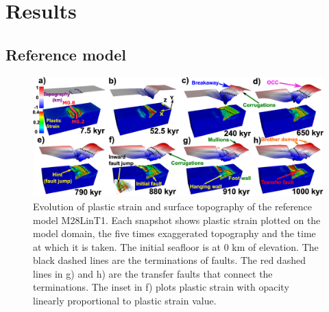 \pagebreak
\section{Results}

\subsection{Reference model}\label{sec_M28LinT1}

\begin{figure}[h]
  \centering
    \includegraphics[width=1.0\textwidth]{./Figures/fig_Results_1_reference_model.eps}
  \caption{Evolution of plastic strain and surface topography of the reference model M28LinT1. Each snapshot shows plastic strain plotted on the model domain, the five times exaggerated topography and the time at which it is taken. The initial seafloor is at 0 km of elevation. The black dashed lines are the terminations of faults. The red dashed lines in g) and h) are the transfer faults that connect the terminations. The inset in f) plots plastic strain with opacity linearly proportional to plastic strain value.}%
 \label{fig_Results1_1}
\end{figure}   

